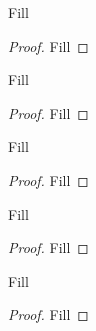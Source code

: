 \begin{exercise}{8}
  Fill
\end{exercise}
\begin{proof}
 Fill
\end{proof}

\begin{exercise}{9}
  Fill
\end{exercise}
\begin{proof}
 Fill
\end{proof}

\begin{exercise}{12}
  Fill
\end{exercise}
\begin{proof}
 Fill
\end{proof}

\begin{exercise}{13}
  Fill
\end{exercise}
\begin{proof}
 Fill
\end{proof}

\begin{exercise}{14}
  Fill
\end{exercise}
\begin{proof}
 Fill
\end{proof}
